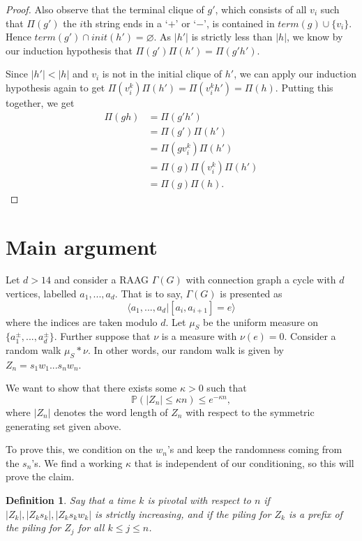 \documentclass[12pt]{article}
\newtheorem{defin}{Definition}
\begin{document}
\begin{proof}
		  Also observe that the terminal clique of $ g' $, which consists of all $ v _{i} $ such that $ \Pi(g') $ the $ i $th string ends in a `$ + $' or `$ - $', is contained in $ term(g) \cup \{v _{i}\} $. Hence $ term(g') \cap init(h') = \varnothing$. As $ |h'| $ is strictly less than $ |h| $, we know by our induction hypothesis that $ \Pi(g')\Pi(h') = \Pi(g'h') $.

		  Since $ |h'| < |h| $ and $ v _{i} $ is not in the initial clique of $ h' $, we can apply our induction hypothesis again to get $ \Pi(v _{i} ^{k})\Pi(h') = \Pi(v _{i} ^{k} h') = \Pi(h) $. Putting this together, we get \begin{align*} 
		  \Pi(gh) &= \Pi(g'h') \\
			     &= \Pi(g')\Pi(h') \\
			     &= \Pi(gv _{i} ^{k}) \Pi(h')\\
			     &= \Pi(g)\Pi(v _{i} ^{k})\Pi(h') \\
			     &= \Pi(g)\Pi(h).
	    \end{align*}
	  \end{proof}

\newpage

\section{Main argument}
Let $ d > 14 $ and consider a RAAG $ \Gamma(G) $ with connection graph a cycle with $ d $ vertices, labelled $ a _{1}, ..., a _{d} $. That is to say, $ \Gamma(G) $ is presented as \[ \langle a _{1}, ..., a _{d}| [a _{i}, a _{i+1}] = e\rangle  \] where the indices are taken modulo $ d $. Let $ \mu _{S} $ be the uniform measure on $ \{ a _{1} ^{\pm }, ..., a _{d} ^{\pm} \} $. Further suppose that $ \nu $ is a measure with $ \nu (e) = 0 $. Consider a random walk $ \mu _{S} * \nu $. In other words, our random walk is given by $ Z _{n} = s _{1} w _{1} ... s _{n}w _{n} $. 

We want to show that there exists some $ \kappa > 0 $ such that \[ \mathbb{P} (|Z _{n}| \leq \kappa n) \leq e ^{-\kappa n},\] where $ |Z _{n}| $ denotes the word length of $ Z _{n} $ with respect to the symmetric generating set given above.

To prove this, we condition on the $ w _{n} $'s and keep the randomness coming from the $ s _{n}$'s. We find a working $ \kappa $ that is independent of our conditioning, so this will prove the claim.


\begin{defin} 
	Say that a time $ k $ is pivotal with respect to $ n $ if $ |Z _{k}|, |Z _{k} s _{k}|, |Z _{k}s_k w _{k}| $ is strictly increasing, and if the piling for $ Z _{k} $ is a prefix of the piling for $ Z _{j} $ for all $ k \leq j \leq n $.
	  \end{defin}
\end{document}
